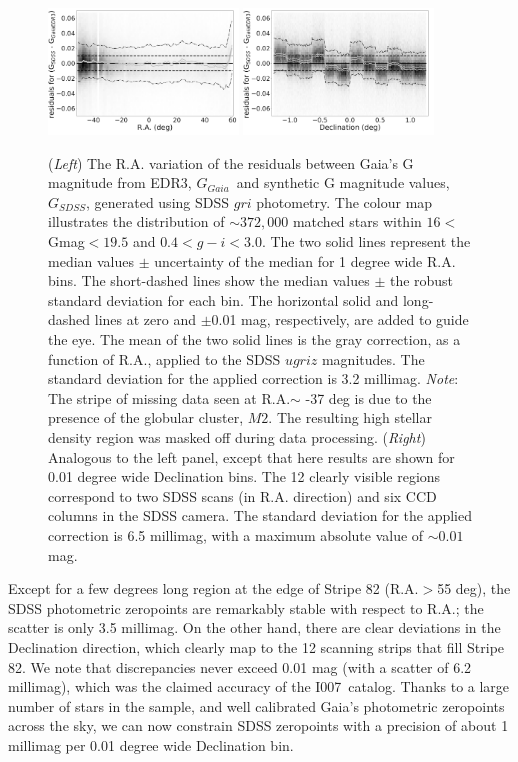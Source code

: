 \documentclass[fleqn,usenatbib]{mnras}
\newcommand{\pOc}{\hbox{I007 catalog}}
\newcommand{\GG}{\hbox{$G_{Gaia}$}}
\newcommand{\GS}{\hbox{$G_{SDSS}$}}
\begin{document}
\begin{figure}
  \centering\includegraphics[width=0.45\textwidth]{figures/GmagCorrection_RA_Hess_lr.png} 
  \centering\includegraphics[width=0.45\textwidth]{figures/GmagCorrection_Dec_Hess_lr.png} 
\caption{({\it Left}) The R.A. variation of the residuals between Gaia's G magnitude from EDR3, \GG\
and synthetic G magnitude values, \GS, generated using SDSS $gri$ photometry. The 
colour map illustrates the distribution of $\sim 372,000$ matched stars within 
$16<$Gmag$<19.5$ and $0.4 < g-i < 3.0$. The two solid lines represent the 
median values $\pm$ uncertainty of the median for 1 degree wide R.A. bins. 
The short-dashed lines show the median values $\pm$ the robust standard 
deviation for each bin. The horizontal solid and long-dashed lines at zero and 
$\pm$0.01 mag, respectively, are added to guide the eye. The mean of the two 
solid lines is the gray correction, as a function of R.A., applied to the SDSS 
$ugriz$ magnitudes. The standard deviation for the applied correction is 3.2 millimag. {\it Note}: 
The stripe of missing data seen at R.A.$\sim$ -37 deg is due to the presence of the globular cluster, $M2$. 
The resulting high stellar density region was masked off during data processing.
({\it Right}) Analogous to the left panel, except that here results are shown for
0.01 degree wide Declination bins. The 12 clearly visible regions correspond to
two SDSS scans (in R.A. direction) and six CCD columns in the SDSS camera. 
The standard deviation for the applied correction is 6.5 millimag, with a maximum
absolute value of $\sim0.01$ mag.}
\label{fig:graycorrRA}
\end{figure}


Except for a few degrees long region at the edge of Stripe 82 (R.A.$>$55 deg), the
SDSS photometric zeropoints are remarkably stable with respect to R.A.; the scatter
is only 3.5 millimag. On the other hand, there are clear deviations in the Declination 
direction, which clearly map to the 12 scanning strips that fill Stripe 82. We note
that discrepancies never exceed 0.01 mag (with a scatter of 6.2 millimag), which was 
the claimed accuracy of the \pOc. Thanks to a large number of stars in the sample,
and well calibrated Gaia's photometric zeropoints across the sky, we can now 
constrain SDSS zeropoints with a precision of about 1 millimag per 0.01 degree
wide Declination bin. 
\end{document}
